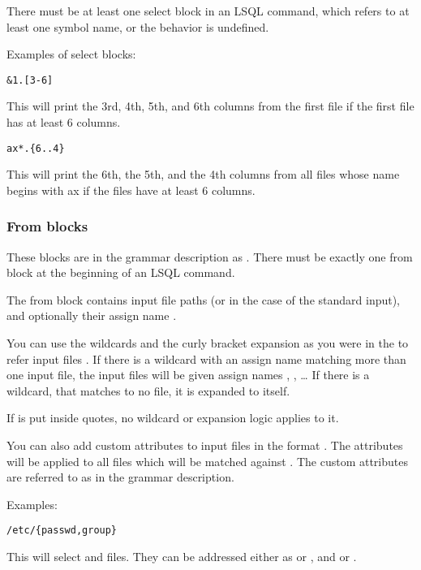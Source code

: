There must be at least one select block in an LSQL command, which refers to at least one symbol name, or the behavior is undefined.

Examples of select blocks:
\begin{verbatim}
&1.[3-6]
\end{verbatim}
This will print the 3rd, 4th, 5th, and 6th columns from the first file if the first file has at least 6 columns.

\begin{verbatim}
ax*.{6..4}
\end{verbatim}
This will print the 6th, the 5th, and the 4th columns from all files whose name begins with ax if the files have at least 6 columns.

\subsubsection{From blocks}
These blocks are in the grammar description as .
There must be exactly one from block at the beginning of an LSQL command. 

The from block contains input file paths (or \icode{-} in the case of the standard input), and optionally their assign name . 

You can use the wildcards and the curly bracket expansion as you were in the  to refer input files \cite{bash-reference-manual}. 
If there is a wildcard with an assign name  matching more than one input file, the input files will be given assign names , , \ldots{}
If there is a wildcard, that matches to no file, it is expanded to itself.

If  is put inside  quotes, no wildcard or expansion logic applies to it.

You can also add custom attributes to input files in the format . The attributes will be applied to all files which will be matched against .
The custom attributes are referred to as  in the grammar description.

Examples:
\begin{verbatim}
/etc/{passwd,group}
\end{verbatim}

This will select  and  files. They can be addressed either as  or , and  or .

